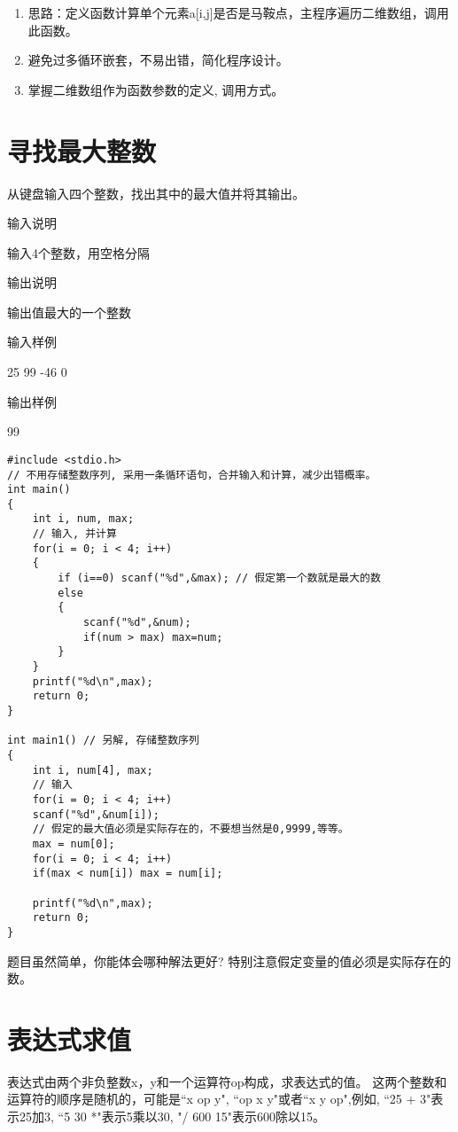 \begin{note}[要点]
	\begin{enumerate}
		\item 思路：定义函数计算单个元素a[i,j]是否是马鞍点，主程序遍历二维数组，调用此函数。
		\item 避免过多循环嵌套，不易出错，简化程序设计。
		\item 掌握二维数组作为函数参数的定义, 调用方式。
	\end{enumerate}
\end{note}

\section{寻找最大整数}
从键盘输入四个整数，找出其中的最大值并将其输出。

输入说明
	
输入4个整数，用空格分隔

输出说明
	
输出值最大的一个整数

输入样例
	
25 99 -46 0

输出样例
	
99

\begin{lstlisting}
#include <stdio.h>
// 不用存储整数序列, 采用一条循环语句，合并输入和计算，减少出错概率。 
int main() 
{
	int i, num, max;
	// 输入, 并计算 
	for(i = 0; i < 4; i++) 
	{ 
		if (i==0) scanf("%d",&max); // 假定第一个数就是最大的数 
		else
		{
			scanf("%d",&num);
			if(num > max) max=num; 
		} 
	} 
	printf("%d\n",max);
	return 0;
} 

int main1() // 另解, 存储整数序列
{
	int i, num[4], max;
	// 输入 
	for(i = 0; i < 4; i++) 
	scanf("%d",&num[i]);
	// 假定的最大值必须是实际存在的，不要想当然是0,9999,等等。
	max = num[0]; 
	for(i = 0; i < 4; i++)  
	if(max < num[i]) max = num[i];
	
	printf("%d\n",max);
	return 0;
} 
\end{lstlisting}

\begin{note}[要点]
	题目虽然简单，你能体会哪种解法更好? 特别注意假定变量的值必须是实际存在的数。
\end{note}

\section{表达式求值}
表达式由两个非负整数x，y和一个运算符op构成，求表达式的值。
这两个整数和运算符的顺序是随机的，可能是``x op y", ``op x y"或者``x y op",例如, ``25 + 3"表示25加3, ``5 30 *"表示5乘以30, "/ 600 15"表示600除以15。

